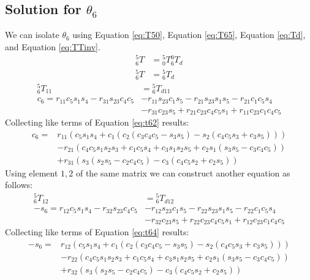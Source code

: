 \subsection{Solution for $\theta_6$}
We can isolate $\theta_6$ using Equation \ref{eq:T50}, Equation \ref{eq:T65}, Equation \ref{eq:Td}, and Equation \ref{eq:TTinv}.
\begin{equation} \label{eq:t61}
    \begin{aligned}
        {_6^{5}}T & ={_0^{5}}T{_6^{0}}T_d \\
        {_6^{5}}T & ={_6^{5}}T_d
    \end{aligned}
\end{equation}
\begin{equation} \label{eq:t62}
    \begin{split}
        {_6^{5}}T_{11}&={_6^{5}}T_{d11}\\
        c_6=r_{11}c_5s_1s_4 - r_{31}s_{23}c_4c_5 &- r_{11}s_{23}c_1s_5 - r_{21}s_{23}s_1s_5 - r_{21}c_1c_5s_4 \\
        &- r_{31}c_{23}s_5 + r_{21}c_{23}c_4c_5s_1 + r_{11}c_{23}c_1c_4c_5
    \end{split}
\end{equation}
Collecting like terms of Equation \ref{eq:t62} results:
\begin{equation} \label{eq:t63}
    \begin{aligned}
        c_6= & r_{11}\left(c_5s_1s_4+c_1(c_2(c_3c_4c_5-s_3s_5)-s_2(c_4c_5s_3+c_3s_5))\right)       \\
             & -r_{21}\left(c_4c_5s_1s_2s_3+c_1c_5s_4+c_3s_1s_2s_5+c_2s_1(s_3s_5-c_3c_4c_5)\right) \\
             & +r_{31}\left(s_3(s_2s_5-c_2c_4c_5)-c_3(c_4c_5s_2+c_2s_5)\right)
    \end{aligned}
\end{equation}
Using element $1, 2$ of the same matrix we can construct another equation as follows:
\begin{equation} \label{eq:t64}
    \begin{split}
        {_6^{5}}T_{12}&={_6^{5}}T_{d12}\\
        -s_6=r_{12}c_5s_1s_4 - r_{32}s_{23}c_4c_5 &- r_{12}s_{23}c_1s_5 - r_{22}s_{23}s_1s_5 - r_{22}c_1c_5s_4 \\
        &- r_{32}c_{23}s_5 + r_{22}c_{23}c_4c_5s_1 + r_{12}c_{23}c_1c_4c_5
    \end{split}
\end{equation}
Collecting like terms of Equation \ref{eq:t64} results:
\begin{equation} \label{eq:t65}
    \begin{aligned}
        -s_6=&r_{12}(c_5s_1s_4+c_1(c_2(c_3c_4c_5-s_3s_5)-s_2(c_4c_5s_3+c_3s_5)))\\
        &-r_{22}(c_4c_5s_1s_2s_3 + c_1c_5s_4 + c_3s_1s_2s_5 + c_2s_1 (s_3s_5 - c_3c_4c_5))\\
        &+r_32(s_3(s_2s_5-c_2c_4c_5)-c_3(c_4c_5s_2+c_2s_5))
    \end{aligned}
\end{equation}
